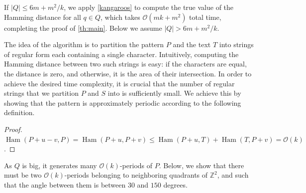 \documentclass[twoside,leqno]{article}
\newcommand{\Z}{\mathbb{Z}}
\renewcommand{\O}{\mathcal{O}}
\DeclareMathOperator*{\Ham}{Ham}
\newcommand{\absolute}[1]{\left\lvert#1\right\rvert}
\begin{document}
If $\absolute{Q} \le 6m + m^2/k$, we apply \cref{kangaroos} to compute the true value of the Hamming distance for all $q \in Q$, which takes $\O(mk+m^2)$ total time, completing the proof of \cref{th:main}. Below we assume $\absolute{Q} > 6m + m^2/k$. 

The idea of the algorithm is to partition the pattern $P$ and the text $T$ into strings of regular form each containing a single character. Intuitively, computing the Hamming distance between two such strings is easy: if the characters are equal, the distance is zero, and otherwise, it is the area of their intersection.
In order to achieve the desired time complexity, it is crucial that the number of regular strings that we partition $P$ and $S$ into is sufficiently small.
We achieve this by showing that the pattern is approximately periodic according to the following definition.

\restateDefTwoDApproxPeriod
\restateClaimPeriodicity
\begin{proof}
$\Ham(P + u - v, P) = \Ham(P + u, P + v) \le \Ham(P + u, T) + \Ham(T,P + v) = \O(k)$.
\end{proof}

As $Q$ is big, it generates many $\O(k)$-periods of $P$. Below, we show that there must be two $\O(k)$-periods belonging to neighboring quadrants of $\Z^2$, and such that the angle between them is between $30$ and $150$ degrees.
\end{document}

